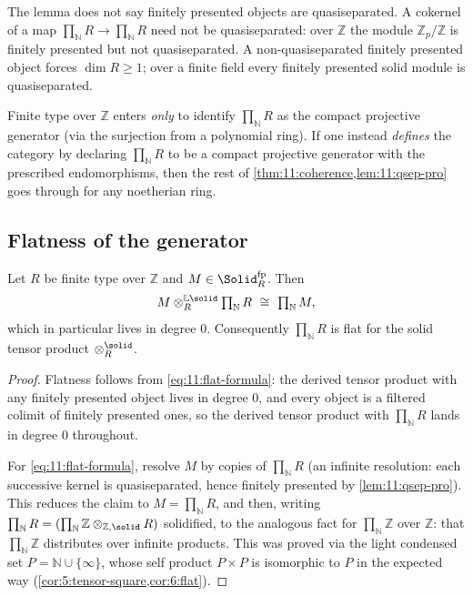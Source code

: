 \begin{remark}
\label{rmk:11:fp-not-qsep}
The lemma does not say finitely presented objects are quasiseparated. A
cokernel of a map $\prod_{\mathbb{N}}R\to\prod_{\mathbb{N}}R$ need not be
quasiseparated: over $\mathbb{Z}$ the module $\mathbb{Z}_{p}/\mathbb{Z}$ is
finitely presented but not quasiseparated. A non-quasiseparated finitely
presented object forces $\dim R\ge 1$; over a finite field every finitely
presented solid module is quasiseparated.
\end{remark}

\begin{remark}
\label{rmk:11:where-finite-type}
Finite type over $\mathbb{Z}$ enters \emph{only} to identify
$\prod_{\mathbb{N}}R$ as the compact projective generator (via the surjection
from a polynomial ring). If one instead \emph{defines} the category by
declaring $\prod_{\mathbb{N}}R$ to be a compact projective generator with the
prescribed endomorphisms, then the rest of \cref{thm:11:coherence,lem:11:qsep-pro} goes through for any noetherian ring.
\end{remark}

\subsection{Flatness of the generator}

\begin{proposition}
\label{prop:11:flat}
Let $R$ be finite type over $\mathbb{Z}$ and $M\in\Solid_{R}^{\mathrm{fp}}$.
Then
\begin{equation}
\label{eq:11:flat-formula}
M\otimes^{\mathbb{L}\solid}_{R}\textstyle\prod_{\mathbb{N}}R\ \cong\
\textstyle\prod_{\mathbb{N}}M,
\end{equation}
which in particular lives in degree $0$. Consequently $\prod_{\mathbb{N}}R$ is
flat for the solid tensor product $\otimes^{\solid}_{R}$.
\end{proposition}

\begin{proof}
Flatness follows from \eqref{eq:11:flat-formula}: the derived tensor product
with any finitely presented object lives in degree $0$, and every object is a
filtered colimit of finitely presented ones, so the derived tensor product
with $\prod_{\mathbb{N}}R$ lands in degree $0$ throughout.

For \eqref{eq:11:flat-formula}, resolve $M$ by copies of $\prod_{\mathbb{N}}R$
(an infinite resolution: each successive kernel is quasiseparated, hence
finitely presented by \cref{lem:11:qsep-pro}). This reduces the claim to
$M=\prod_{\mathbb{N}}R$, and then, writing $\prod_{\mathbb{N}}R=(\prod_{\mathbb
{N}}\mathbb{Z}\otimes_{\mathbb{Z},\solid}R)$ solidified, to the analogous fact
for $\prod_{\mathbb{N}}\mathbb{Z}$ over $\mathbb{Z}$: that
$\prod_{\mathbb{N}}\mathbb{Z}$ distributes over infinite products. This was
proved via the light condensed set $P=\mathbb{N}\cup\{\infty\}$, whose self
product $P\times P$ is isomorphic to $P$ in the expected way
(\cref{cor:5:tensor-square,cor:6:flat}).
\end{proof}

